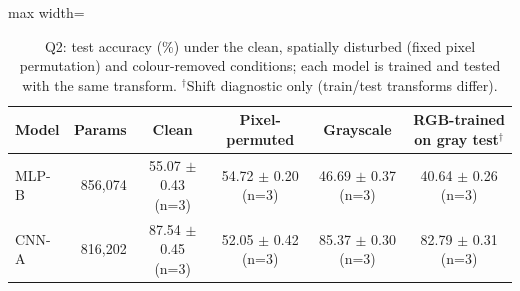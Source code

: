 \begin{table}[t]\centering\footnotesize\setlength{\tabcolsep}{3pt}
\begin{adjustbox}{max width=\textwidth}
\begin{tabular}{lrcccc}\toprule
Model & Params & Clean & Pixel-permuted & Grayscale & RGB-trained on gray test$^\dagger$ \\\midrule
MLP-B & 856,074 & 55.07 $\pm$ 0.43 (n=3) & 54.72 $\pm$ 0.20 (n=3) & 46.69 $\pm$ 0.37 (n=3) & 40.64 $\pm$ 0.26 (n=3) \\
CNN-A & 816,202 & 87.54 $\pm$ 0.45 (n=3) & 52.05 $\pm$ 0.42 (n=3) & 85.37 $\pm$ 0.30 (n=3) & 82.79 $\pm$ 0.31 (n=3) \\
\bottomrule\end{tabular}
\end{adjustbox}
\caption{Q2: test accuracy (\%) under the clean, spatially disturbed (fixed pixel permutation) and colour-removed conditions; each model is trained and tested with the same transform. $^\dagger$Shift diagnostic only (train/test transforms differ).}\label{tab:q2}\end{table}
